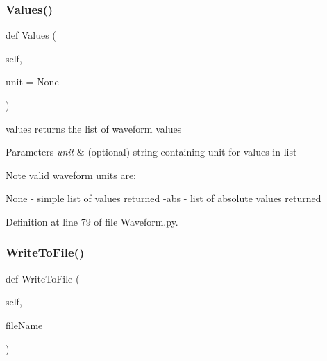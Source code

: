 \subsubsection{\texorpdfstring{Values()}{Values()}}
{\footnotesize\ttfamily def Values (\begin{DoxyParamCaption}\item[{}]{self,  }\item[{}]{unit = {\ttfamily None} }\end{DoxyParamCaption})}



values returns the list of waveform values 


\begin{DoxyParams}{Parameters}
{\em unit} & (optional) string containing unit for values in list \\
\hline
\end{DoxyParams}
\begin{DoxyNote}{Note}
valid waveform units are\+:
\begin{DoxyItemize}
\item None -\/ simple list of values returned -\/\textquotesingle{}abs\textquotesingle{} -\/ list of absolute values returned 
\end{DoxyItemize}
\end{DoxyNote}


Definition at line 79 of file Waveform.\+py.

\mbox{\label{classSignalIntegrity_1_1TimeDomain_1_1Waveform_1_1Waveform_1_1Waveform_a9bc60dff701312ba7ddf47ee941bbc8f}} 
\subsubsection{\texorpdfstring{Write\+To\+File()}{WriteToFile()}}
{\footnotesize\ttfamily def Write\+To\+File (\begin{DoxyParamCaption}\item[{}]{self,  }\item[{}]{file\+Name }\end{DoxyParamCaption})}



